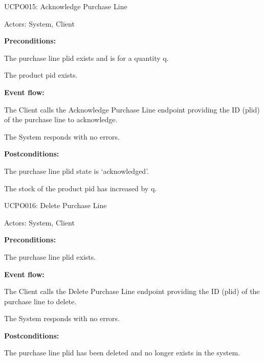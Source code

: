 \begin{ucbox}{UCPO015: Acknowledge Purchase Line}
\label{UCPO015}

Actors: System, Client

\textbf{Preconditions:}

\ucitem The purchase line plid exists and is for a quantity q.

\ucitem The product pid exists. 

\textbf{Event flow:}

\ucitem The Client calls the Acknowledge Purchase Line endpoint providing the ID (plid) of the purchase line to acknowledge.

\ucitem The System responds with no errors.

\textbf{Postconditions:}

\ucitem The purchase line plid state is ‘acknowledged’.

\ucitem The stock of the product pid has increased by q.

\end{ucbox}

\begin{ucbox}{UCPO016: Delete Purchase Line}
\label{UCPO016}

Actors: System, Client

\textbf{Preconditions:}

\ucitem The purchase line plid exists.

\textbf{Event flow:}

\ucitem The Client calls the Delete Purchase Line endpoint providing the ID (plid) of the purchase line to delete.

\ucitem The System responds with no errors.

\textbf{Postconditions:}

\ucitem The purchase line plid has been deleted and no longer exists in the system.

\end{ucbox}
\newpage